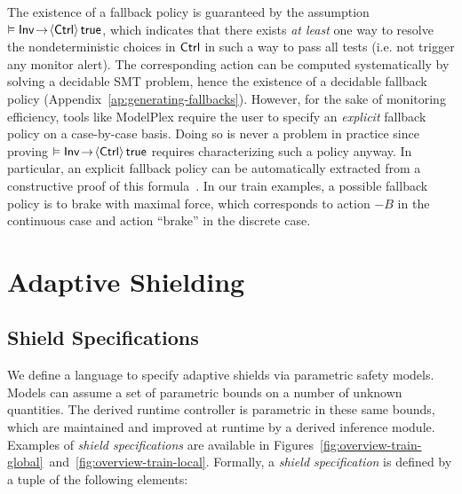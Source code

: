 \documentclass[acmsmall,screen,nonacm]{acmart}
\begin{document}
The existence of a fallback policy is guaranteed by the assumption $\vDash \mathsf{Inv} \!\!\,\rightarrow\,\!\! \langle\mathsf{Ctrl}\rangle\,\mathsf{true}$, which indicates that there exists \emph{at least} one way to resolve the nondeterministic choices in $\mathsf{Ctrl}$ in such a way to pass all tests (i.e. not trigger any monitor alert). The corresponding action can be computed systematically by solving a decidable SMT problem, hence the existence of a decidable fallback policy (Appendix~\ref{ap:generating-fallbacks}). However, for the sake of monitoring efficiency, tools like ModelPlex require the user to specify an \emph{explicit} fallback policy on a case-by-case basis. Doing so is never a problem in practice since proving $\vDash \mathsf{Inv} \!\!\,\rightarrow\,\!\! \langle\mathsf{Ctrl}\rangle\,\mathsf{true}$ requires characterizing such a policy anyway. In particular, an explicit fallback policy can be automatically extracted from a constructive proof of this formula~\cite{bohrer2020constructive}. In our train examples, a possible fallback policy is to brake with maximal force, which corresponds to action $-B$ in the continuous case and action ``\textsf{brake}'' in the discrete case.





\section{Adaptive Shielding}\label{sec:adaptive-shielding}

\subsection{Shield Specifications}\label{sec:shield-spec}

We define a language to specify adaptive shields via parametric safety models. Models can assume a set of parametric bounds on a number of unknown quantities. The derived runtime controller is parametric in these same bounds, which are maintained and improved at runtime by a derived inference module.  Examples of \emph{shield specifications} are available in Figures~\ref{fig:overview-train-global}~and~\ref{fig:overview-train-local}. Formally, a \emph{shield specification} is defined by a tuple of the following elements:
\end{document}
